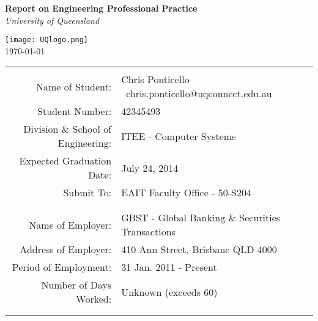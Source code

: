 \thispagestyle{empty}

\begin{titlepage}
\begin{center}

\vspace{1 cm}
\huge\textbf{Report on Engineering Professional Practice} \\
\vspace{0.5 cm}
\huge\textit{University of Queensland} \\
\vspace{0.5 cm}

\texttt{[image: UQlogo.png]}
\vspace{0.5 cm}\\
\large \today \\
\vspace{0.5 cm}

\begin{table}[ht]
	\center
	\begin{tabular}{r l}
	\\
	\hline
	\\
	Name of Student: & Chris Ponticello \textbar \ 
		chris.ponticello@uqconnect.edu.au \\
	Student Number: & 42345493 \\
	Division \& School of Engineering: & ITEE - Computer Systems \\
	Expected Graduation Date: & July 24, 2014 \\
	Submit To: & EAIT Faculty Office - 50-S204 \\
	\\
	\hline
	\\
	Name of Employer: & GBST - Global Banking \& Securities Transactions \\
	Address of Employer: & 410 Ann Street, Brisbane QLD 4000 \\
	Period of Employment: & 31 Jan. 2011 - Present\\
	Number of Days Worked: & Unknown (exceeds 60)\footnotemark[1]\\
	\\
	\hline
	\\
	\end{tabular}
\end{table} 


\end{center}
\end{titlepage}
